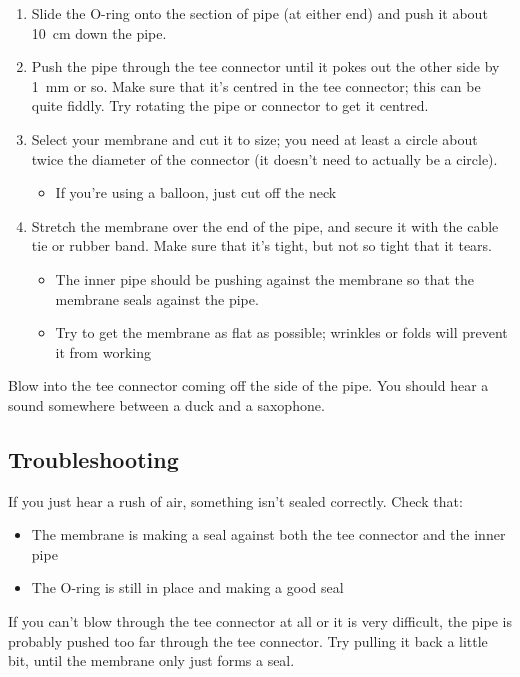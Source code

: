 \documentclass{article}
\begin{document}
\begin{enumerate}
    \item Slide the O-ring onto the section of pipe (at either end) and push it about \SI{10}{\centi\meter} down the pipe. 
    \item Push the pipe through the tee connector until it pokes out the other side by \SI{1}{\milli\meter} or so. Make sure that it's centred in the tee connector; this can be quite fiddly. Try rotating the pipe or connector to get it centred.
    \item Select your membrane and cut it to size; you need at least a circle about twice the diameter of the connector (it doesn't need to actually be a circle). 
    \begin{itemize}
        \item If you're using a balloon, just cut off the neck
    \end{itemize}
    \item Stretch the membrane over the end of the pipe, and secure it with the cable tie or rubber band. Make sure that it's tight, but not so tight that it tears.
    \begin{itemize}
        \item The inner pipe should be pushing against the membrane so that the membrane seals against the pipe. 
        \item Try to get the membrane as flat as possible; wrinkles or folds will prevent it from working
    \end{itemize}
\end{enumerate}

Blow into the tee connector coming off the side of the pipe. You should hear a sound somewhere between a duck and a saxophone. 

\subsection{Troubleshooting}

If you just hear a rush of air, something isn't sealed correctly. Check that:
\begin{itemize}
    \item The membrane is making a seal against both the tee connector and the inner pipe
    \item The O-ring is still in place and making a good seal
\end{itemize}

If you can't blow through the tee connector at all or it is very difficult, the pipe is probably pushed too far through the tee connector. Try pulling it back a little bit, until the membrane only just forms a seal.
\end{document}
